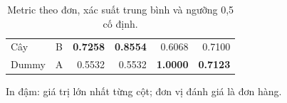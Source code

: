 \begin{table}[!htbp]\centering
\caption{Metric theo đơn, xác suất trung bình và ngưỡng 0,5 cố định.}\label{tab:orders}
\begin{tabularx}{\linewidth}{|Y|c|r|r|r|r|}\hline
{} &  &  &  &  &  \\\hline
Cây & B & \textbf{0.7258} & \textbf{0.8554} & 0.6068 & 0.7100 \\
Dummy & A & 0.5532 & 0.5532 & \textbf{1.0000} & \textbf{0.7123} \\
\hline\end{tabularx}
\par\smallskip\raggedright In đậm: giá trị lớn nhất từng cột; đơn vị đánh giá là đơn hàng.
\end{table}

